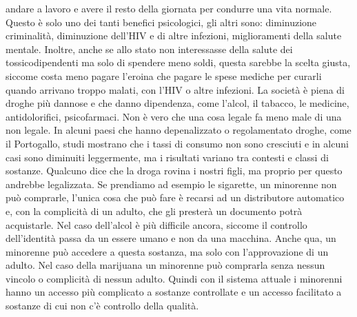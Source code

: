 \documentclass[12pt]{book} %
\begin{document}
\begin{mdframed}[linewidth=1pt]
andare a lavoro e avere il resto della giornata per condurre una vita normale. Questo è solo uno dei tanti benefici
psicologici, gli altri sono: diminuzione criminalità, diminuzione dell'HIV e di altre infezioni,
miglioramenti della salute mentale. Inoltre, anche se allo stato non interessasse della salute dei tossicodipendenti ma
solo di spendere meno soldi, questa sarebbe la scelta giusta, siccome costa meno pagare l'eroina
che pagare le spese mediche per curarli quando arrivano troppo malati, con l'HIV o altre
infezioni. La società è piena di droghe più dannose e che danno dipendenza, come l'alcol, il
tabacco, le medicine, antidolorifici, psicofarmaci. Non è vero che una cosa legale fa meno male di una non legale.
In alcuni paesi che hanno depenalizzato o regolamentato droghe, come il Portogallo, studi mostrano che i tassi di consumo non sono cresciuti e in alcuni casi sono diminuiti leggermente, ma i risultati variano tra contesti e classi di sostanze. Qualcuno dice che
la droga rovina i nostri figli, ma proprio per questo andrebbe legalizzata. Se prendiamo ad esempio le sigarette, un
minorenne non può comprarle, l'unica cosa che può fare è recarsi ad un distributore automatico e,
con la complicità di un adulto, che gli presterà un documento potrà acquistarle. Nel caso
dell'alcol è più difficile ancora, siccome il controllo dell'identità passa da un essere umano e non da una macchina. Anche qua, un minorenne può accedere a questa sostanza, ma
solo con l'approvazione di un adulto. Nel caso della marijuana un minorenne può comprarla senza
nessun vincolo o complicità di nessun adulto. Quindi con il sistema attuale i minorenni hanno un accesso più complicato
a sostanze controllate e un accesso facilitato a sostanze di cui non c'è controllo della qualità.
\end{mdframed}
\end{document}
